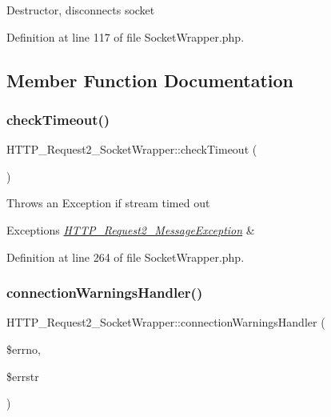 Destructor, disconnects socket 

Definition at line 117 of file Socket\+Wrapper.\+php.



\subsection{Member Function Documentation}
\hypertarget{classHTTP__Request2__SocketWrapper_a4325bbe1d479b4e3dd106624c38118a3}{}\label{classHTTP__Request2__SocketWrapper_a4325bbe1d479b4e3dd106624c38118a3} 
\subsubsection{\texorpdfstring{check\+Timeout()}{checkTimeout()}}
{\footnotesize\ttfamily H\+T\+T\+P\+\_\+\+Request2\+\_\+\+Socket\+Wrapper\+::check\+Timeout (\begin{DoxyParamCaption}{ }\end{DoxyParamCaption})\hspace{0.3cm}{\ttfamily [protected]}}

Throws an Exception if stream timed out


\begin{DoxyExceptions}{Exceptions}
{\em \hyperlink{classHTTP__Request2__MessageException}{H\+T\+T\+P\+\_\+\+Request2\+\_\+\+Message\+Exception}} & \\
\hline
\end{DoxyExceptions}


Definition at line 264 of file Socket\+Wrapper.\+php.

\hypertarget{classHTTP__Request2__SocketWrapper_aa26d77c799f9525f11adc23c7b4e7698}{}\label{classHTTP__Request2__SocketWrapper_aa26d77c799f9525f11adc23c7b4e7698} 
\subsubsection{\texorpdfstring{connection\+Warnings\+Handler()}{connectionWarningsHandler()}}
{\footnotesize\ttfamily H\+T\+T\+P\+\_\+\+Request2\+\_\+\+Socket\+Wrapper\+::connection\+Warnings\+Handler (\begin{DoxyParamCaption}\item[{}]{\$errno,  }\item[{}]{\$errstr }\end{DoxyParamCaption})\hspace{0.3cm}{\ttfamily [protected]}}

